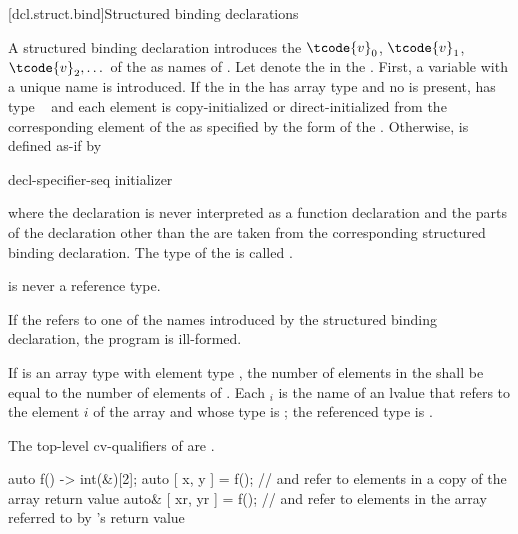 [dcl.struct.bind]{Structured binding declarations}%
%
%

\pnum
A structured binding declaration introduces the 
$\tcode{v}_0$, $\tcode{v}_1$, $\tcode{v}_2, \dotsc$
of the
 as names
of .
Let \cv{} denote the
 in the . First, a
variable with a unique name  is introduced. If the
 in the 
has array type  and no  is present, 
has type \cv{}~ and each element is copy-initialized or direct-initialized
from the corresponding element of the  as specified
by the form of the .
Otherwise, 
is defined as-if by

\begin{ncbnf}
 decl-specifier-seq   initializer \terminal{;}
\end{ncbnf}

where
the declaration is never interpreted as a function declaration and
the parts of the declaration other than the  are taken
from the corresponding structured binding declaration.
The type of the 
 is called .
\begin{note}
 is never a reference type.
\end{note}

\pnum
If the  refers to
one of the names introduced by the structured binding declaration,
the program is ill-formed.

\pnum
If  is an array type with element type , the number
of elements in the  shall be equal to the
number of elements of . Each $_i$ is the name of an
lvalue that refers to the element $i$ of the array and whose type
is ; the referenced type is .
\begin{note}
The top-level cv-qualifiers of  are \cv.
\end{note}
\begin{example}
\begin{codeblock}
  auto f() -> int(&)[2];
  auto [ x, y ] = f();          //  and  refer to elements in a copy of the array return value
  auto& [ xr, yr ] = f();       //  and  refer to elements in the array referred to by 's return value
\end{codeblock}
\end{example}

